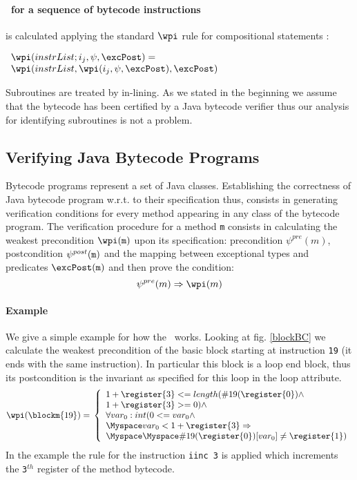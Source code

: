 \paragraph{\wpi \ for a sequence of bytecode instructions} is calculated applying the standard $\wpi$ rule for compositional statements :
\begin{center}
$ \begin{array}{l} \wpi( instrList;i_{j}, \psi,\excPost ) = \\ \wpi(instrList, \wpi(i_{j}, \psi,\excPost ),\excPost ) \end{array} $
\end{center}
Subroutines are treated by in-lining. As we stated in the beginning we assume that the bytecode has been certified by a Java
bytecode verifier thus our analysis for identifying  subroutines is not a problem.  


\subsection{Verifying Java Bytecode Programs} Bytecode programs represent a set of Java classes. Establishing the correctness of Java bytecode program w.r.t. to their specification thus, consists in generating verification conditions for every method appearing in any class of the bytecode program.
The verification procedure for a method \texttt{m} consists in  calculating the weakest precondition $\wpi(\tt{m})$ upon its specification: precondition $\psi^{pre}(m)$, 
postcondition $\psi^{post}(\tt{m})$ and the mapping between exceptional types and predicates $\excPost(\tt{m})$ and then prove the condition: 
$$
\psi^{pre}(m)  \Rightarrow \wpi(m)
$$    

\paragraph{Example} We give a simple example for how the \wpi \ works. Looking at fig. \ref{blockBC} we calculate the weakest precondition of the basic block starting at instruction \texttt{19} (it ends with the same instruction). In particular this block is a loop end block, thus its postcondition is
the invariant as specified for this loop in the loop attribute.
$$
\wpi(\blockm{19}) = \\
\left\{ \begin{array}{l}    
1 + \register{3} <= length(\#19(\register{0}) \wedge \\
                      1 + \register{3} >= 0)  \wedge \\ 
                        \forall  var_0:int  (  0 <= var_0 \wedge \\
                    \Myspace    var_0 < 1 + \register{3}  \Rightarrow \\
                \Myspace \Myspace \#19(\register{0})[var_0] \neq \register{1})
\end{array}
\right.
$$
In the example the rule for the instruction \texttt{iinc 3} is applied which increments the \texttt{3$^{th}$} register of the method bytecode. 

